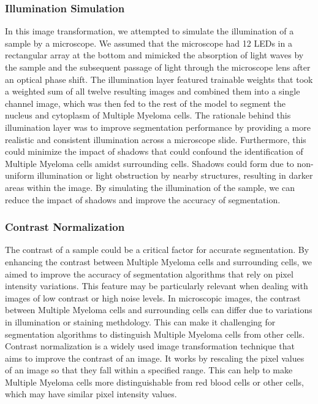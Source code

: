 \documentclass{article}
\begin{document}
\subsubsection{Illumination Simulation}
In this image transformation, we attempted to simulate the illumination of a sample by a microscope. We assumed that the microscope had 12 LEDs in a rectangular array at the bottom and mimicked the absorption of light waves by the sample and the subsequent passage of light through the microscope lens after an optical phase shift. The illumination layer featured trainable weights that took a weighted sum of all twelve resulting images and combined them into a single channel image, which was then fed to the rest of the model to segment the nucleus and cytoplasm of Multiple Myeloma cells. The rationale behind this illumination layer was to improve segmentation performance by providing a more realistic and consistent illumination across a microscope slide. Furthermore, this could minimize the impact of shadows that could confound the identification of Multiple Myeloma cells amidst surrounding cells. Shadows could form due to non-uniform illumination or light obstruction by nearby structures, resulting in darker areas within the image. By simulating the illumination of the sample, we can reduce the impact of shadows and improve the accuracy of segmentation.

\subsubsection{Contrast Normalization}
The contrast of a sample could be a critical factor for accurate segmentation. By enhancing the contrast between Multiple Myeloma cells and surrounding cells, we aimed to improve the accuracy of segmentation algorithms that rely on pixel intensity variations. This feature may be particularly relevant when dealing with images of low contrast or high noise levels. In microscopic images, the contrast between Multiple Myeloma cells and surrounding cells can differ due to variations in illumination or staining methdology. This can make it challenging for segmentation algorithms to distinguish Multiple Myeloma cells from other cells. Contrast normalization is a widely used image transformation technique that aims to improve the contrast of an image. It works by rescaling the pixel values of an image so that they fall within a specified range. This can help to make Multiple Myeloma cells more distinguishable from red blood cells or other cells, which may have similar pixel intensity values.
\end{document}

